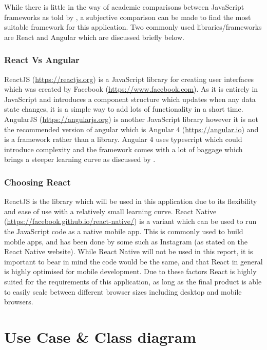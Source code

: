 \documentclass[a4paper,12pt]{report}
\begin{document}
      While there is little in the way of academic comparisons between JavaScript frameworks as told by \cite{graziotin2013making}, a subjective comparison can be made to find the most suitable framework for this application. Two commonly used libraries/frameworks are React and Angular which are discussed briefly below.

      \subsubsection{React Vs Angular}
        ReactJS (\url{https://reactjs.org}) is a JavaScript library for creating user interfaces which was created by Facebook (\url{https://www.facebook.com}). As it is entirely in JavaScript and introduces a component structure which updates when any data state changes, it is a simple way to add lots of functionality in a short time. AngularJS (\url{https://angularjs.org}) is another JavaScript library however it is not the recommended version of angular which is Angular 4 (\url{https://angular.io}) and is a framework rather than a library. Angular 4 uses typescript which could introduce complexity and the framework comes with a lot of baggage which brings a steeper learning curve as discussed by \cite{neuhaus_2017}.

      \subsubsection{Choosing React}
        ReactJS is the library which will be used in this application due to its flexibility and ease of use with a relatively small learning curve. React Native (\url{https://facebook.github.io/react-native/}) is a variant which can be used to run the JavaScript code as a native mobile app. This is commonly used to build mobile apps, and has been done by some such as Instagram (as stated on the React Native website). While React Native will not be used in this report, it is important to bear in mind the code would be the same, and that React in general is highly optimised for mobile development. Due to these factors React is highly suited for the requirements of this application, as long as the final product is able to easily scale between different browser sizes including desktop and mobile browsers.

  \section{Use Case \& Class diagram}
\end{document}

